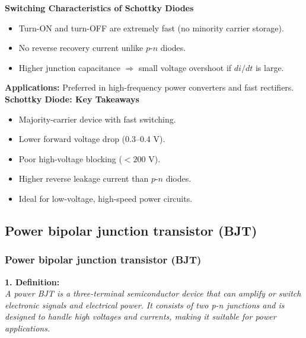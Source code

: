 \begin{frame}{\textbf{Switching Characteristics of Schottky Diodes}}
    \begin{itemize}
        \item Turn-ON and turn-OFF are extremely fast (no minority carrier storage).
        \item No reverse recovery current unlike $p$-$n$ diodes.
        \item Higher junction capacitance $\Rightarrow$ small voltage overshoot if $di/dt$ is large.
    \end{itemize}
    
    \textbf{Applications:} Preferred in high-frequency power converters and fast rectifiers. \\
    \textbf{Schottky Diode: Key Takeaways}
    \begin{itemize}
        \item Majority-carrier device with fast switching.
        \item Lower forward voltage drop (0.3–0.4 V).
        \item Poor high-voltage blocking ($<200$ V).
        \item Higher reverse leakage current than $p$-$n$ diodes.
        \item Ideal for low-voltage, high-speed power circuits.
    \end{itemize}
\end{frame}
    


\subsection{Power bipolar junction transistor (BJT)}

\begin{frame}
    \frametitle{Power bipolar junction transistor (BJT)}
    \textbf{1. Definition:} \\
    \textit{A power BJT is a three-terminal semiconductor device that can amplify or switch electronic signals and electrical power. It consists of two p-n junctions and is designed to handle high voltages and currents, making it suitable for power applications.}

\end{frame}